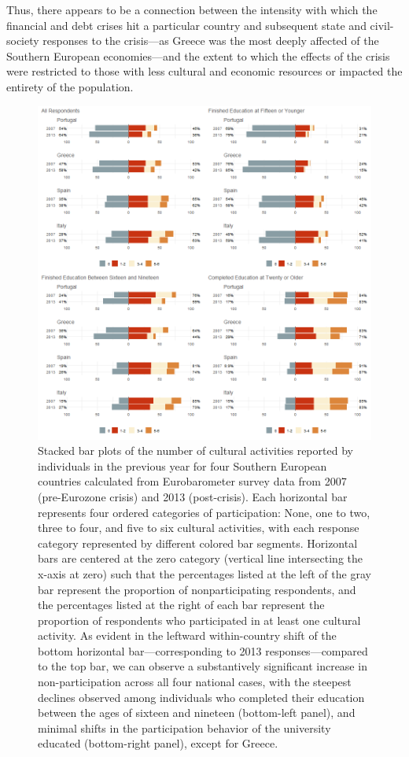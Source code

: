 \documentclass{article}
\begin{document}
Thus, there appears to be a connection between the intensity with which the financial and debt crises hit a particular country and subsequent state and civil-society responses to the crisis---as Greece was the most deeply affected of the Southern European economies---and the extent to which the effects of the crisis were restricted to those with less cultural and economic resources or impacted the entirety of the population. 

\begin{figure}
    \centering
    \includegraphics[width=1.0\textwidth]{cult-cat-by-year-by-country-combo.png}
    \caption{Stacked bar plots of the number of cultural activities reported by individuals in the previous year for four Southern European countries calculated from Eurobarometer survey data from 2007 (pre-Eurozone crisis) and 2013 (post-crisis). Each horizontal bar represents four ordered categories of participation: None, one to two, three to four, and five to six cultural activities, with each response category represented by different colored bar segments. Horizontal bars are centered at the zero category (vertical line intersecting the x-axis at zero) such that the percentages listed at the left of the gray bar represent the proportion of nonparticipating respondents, and the percentages listed at the right of each bar represent the proportion of respondents who participated in at least one cultural activity. As evident in the leftward within-country shift of the bottom horizontal bar---corresponding to 2013 responses---compared to the top bar, we can observe a substantively significant increase in non-participation across all four national cases, with the steepest declines observed among individuals who completed their education between the ages of sixteen and nineteen (bottom-left panel), and minimal shifts in the participation behavior of the university educated (bottom-right panel), except for Greece.}
    \label{fig: main}
\end{figure}
\end{document}
